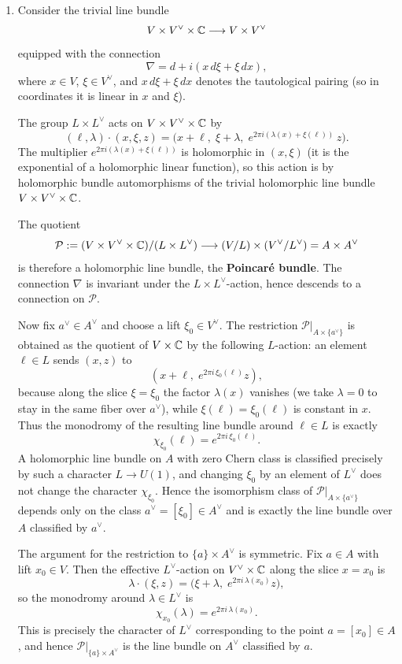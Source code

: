 \documentclass[12pt]{article}
\begin{document}
\begin{solution}
\begin{enumerate}
\item Consider the trivial line bundle
\[
V\times V^\vee \times \mathbb{C} \longrightarrow V\times V^\vee
\]
equipped with the connection
\[
\nabla = d + i(x\,d\xi + \xi\,dx),
\]
where $x\in V$, $\xi\in V^\vee$, and $x\,d\xi+\xi\,dx$ denotes the
tautological pairing (so in coordinates it is linear in $x$ and $\xi$).

The group $L\times L^\vee$ acts on $V\times V^\vee\times\mathbb{C}$ by
\[
(\ell,\lambda)\cdot(x,\xi,z)
= \bigl(x+\ell,\;\xi+\lambda,\;
   e^{2\pi i(\lambda(x)+\xi(\ell))}\,z\bigr).
\]
The multiplier
\(
e^{2\pi i(\lambda(x)+\xi(\ell))}
\)
is holomorphic in $(x,\xi)$ (it is the exponential of a holomorphic linear
function), so this action is by holomorphic bundle automorphisms of the
trivial holomorphic line bundle $V\times V^\vee\times\mathbb{C}$.

The quotient
\[
\mathcal{P}
:= (V\times V^\vee\times\mathbb{C})/(L\times L^\vee)
\longrightarrow (V/L)\times(V^\vee/L^\vee)
= A\times A^\vee
\]
is therefore a holomorphic line bundle, the \textbf{Poincar\'e bundle}.  The
connection $\nabla$ is invariant under the $L\times L^\vee$-action, hence
descends to a connection on $\mathcal{P}$.

Now fix $a^\vee\in A^\vee$ and choose a lift $\xi_0\in V^\vee$.
The restriction $\mathcal{P}|_{A\times\{a^\vee\}}$ is obtained as the
quotient of $V\times\mathbb{C}$ by the following $L$-action: an element
$\ell\in L$ sends $(x,z)$ to
\[
(x+\ell,\;e^{2\pi i\,\xi_0(\ell)}z),
\]
because along the slice $\xi=\xi_0$ the factor $\lambda(x)$ vanishes
(we take $\lambda=0$ to stay in the same fiber over $a^\vee$), while
$\xi(\ell)=\xi_0(\ell)$ is constant in $x$.  Thus the monodromy of the
resulting line bundle around $\ell\in L$ is exactly
\[
\chi_{\xi_0}(\ell) = e^{2\pi i\,\xi_0(\ell)}.
\]
A holomorphic line bundle on $A$ with zero Chern class is
classified precisely by such a character $L\to U(1)$, and changing
$\xi_0$ by an element of $L^\vee$ does not change the character
$\chi_{\xi_0}$.  Hence the isomorphism class of
$\mathcal{P}|_{A\times\{a^\vee\}}$ depends only on the class
$a^\vee = [\xi_0]\in A^\vee$ and is exactly the line bundle over $A$
classified by $a^\vee$.

The argument for the restriction to $\{a\}\times A^\vee$ is symmetric.
Fix $a\in A$ with lift $x_0\in V$.  Then the effective $L^\vee$-action
on $V^\vee\times\mathbb{C}$ along the slice $x=x_0$ is
\[
\lambda\cdot(\xi,z)
= \bigl(\xi+\lambda,\; e^{2\pi i\,\lambda(x_0)} z\bigr),
\]
so the monodromy around $\lambda\in L^\vee$ is
\[
\chi_{x_0}(\lambda) = e^{2\pi i\,\lambda(x_0)}.
\]
This is precisely the character of $L^\vee$ corresponding to the point $a=[x_0]\in A$, and hence
$\mathcal{P}|_{\{a\}\times A^\vee}$ is the line bundle on $A^\vee$
classified by $a$.
  \end{enumerate}
\end{solution}
\end{document}
